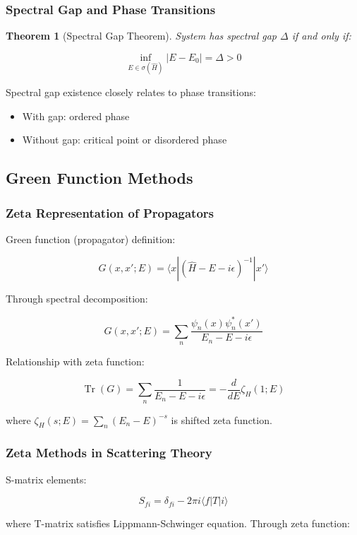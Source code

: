 \documentclass[12pt,a4paper]{article}
\newtheorem{theorem}{Theorem}[section]
\DeclareMathOperator{\Tr}{Tr}
\begin{document}
\subsubsection{Spectral Gap and Phase Transitions}

\begin{theorem}[Spectral Gap Theorem]
System has spectral gap $\Delta$ if and only if:

$$\inf_{E \in \sigma(\hat{H})} |E - E_0| = \Delta > 0$$
\end{theorem}

Spectral gap existence closely relates to phase transitions:
\begin{itemize}
\item With gap: ordered phase
\item Without gap: critical point or disordered phase
\end{itemize}

\subsection{Green Function Methods}

\subsubsection{Zeta Representation of Propagators}

Green function (propagator) definition:

$$G(x, x'; E) = \langle x|(\hat{H} - E - i\epsilon)^{-1}|x'\rangle$$

Through spectral decomposition:

$$G(x, x'; E) = \sum_n \frac{\psi_n(x)\psi_n^*(x')}{E_n - E - i\epsilon}$$

Relationship with zeta function:

$$\Tr(G) = \sum_n \frac{1}{E_n - E - i\epsilon} = -\frac{d}{dE}\zeta_H(1; E)$$

where $\zeta_H(s; E) = \sum_n (E_n - E)^{-s}$ is shifted zeta function.

\subsubsection{Zeta Methods in Scattering Theory}

S-matrix elements:

$$S_{fi} = \delta_{fi} - 2\pi i \langle f|T|i\rangle$$

where T-matrix satisfies Lippmann-Schwinger equation. Through zeta function:
\end{document}
